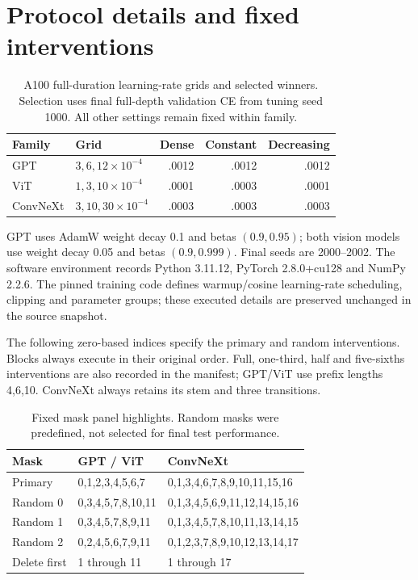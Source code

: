 \documentclass[10pt,letterpaper]{article}
\begin{document}
\clearpage
\appendix
\section{Protocol details and fixed interventions}\label{app:protocol}
\begin{table}[h]
\centering\small
\caption{A100 full-duration learning-rate grids and selected winners. Selection uses final full-depth validation CE from tuning seed 1000. All other settings remain fixed within family.}
\begin{tabularx}{\linewidth}{@{}lXrrr@{}}\toprule
Family & Grid & Dense & Constant & Decreasing\\\midrule
GPT & $3,6,12\times10^{-4}$ & .0012 & .0012 & .0012\\
ViT & $1,3,10\times10^{-4}$ & .0001 & .0003 & .0001\\
ConvNeXt & $3,10,30\times10^{-4}$ & .0003 & .0003 & .0003\\\bottomrule
\end{tabularx}
\end{table}
GPT uses AdamW weight decay 0.1 and betas $(0.9,0.95)$; both vision models use weight decay 0.05 and betas $(0.9,0.999)$. Final seeds are 2000--2002. The software environment records Python 3.11.12, PyTorch 2.8.0+cu128 and NumPy 2.2.6. The pinned training code defines warmup/cosine learning-rate scheduling, clipping and parameter groups; these executed details are preserved unchanged in the source snapshot.

The following zero-based indices specify the primary and random interventions. Blocks always execute in their original order. Full, one-third, half and five-sixths interventions are also recorded in the manifest; GPT/ViT use prefix lengths 4,6,10. ConvNeXt always retains its stem and three transitions.
\begin{table}[h]
\centering\small
\caption{Fixed mask panel highlights. Random masks were predefined, not selected for final test performance.}
\begin{tabularx}{\linewidth}{@{}lXX@{}}\toprule
Mask & GPT / ViT & ConvNeXt\\\midrule
Primary & 0,1,2,3,4,5,6,7 & 0,1,3,4,6,7,8,9,10,11,15,16\\
Random 0 & 0,3,4,5,7,8,10,11 & 0,1,3,4,5,6,9,11,12,14,15,16\\
Random 1 & 0,3,4,5,7,8,9,11 & 0,1,3,4,5,7,8,10,11,13,14,15\\
Random 2 & 0,2,4,5,6,7,9,11 & 0,1,2,3,7,8,9,10,12,13,14,17\\
Delete first & 1 through 11 & 1 through 17\\\bottomrule
\end{tabularx}
\end{table}
\end{document}
